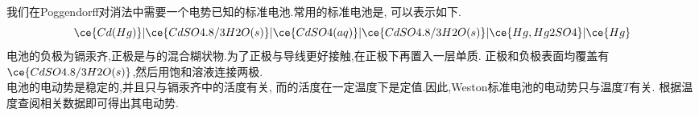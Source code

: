 \documentclass{ctexart}
\begin{document}
\indent 我们在Poggendorff对消法中需要一个电势已知的标准电池.常用的标准电池是,%
可以表示如下.
\[\ce{Cd(Hg)}\vert\ce{CdSO4.8/3H2O(s)}\vert\ce{CdSO4(aq)}\vert\ce{CdSO4.8/3H2O(s)}\vert\ce{Hg,Hg2SO4}\vert\ce{Hg}\]
电池的负极为镉汞齐,正极是与的混合糊状物.为了正极与导线更好接触,在正极下再置入一层单质.%
正极和负极表面均覆盖有$\displaystyle\ce{CdSO4.8/3H2O(s)}$,然后用饱和溶液连接两极.\\
\indent 电池的电动势是稳定的,并且只与镉汞齐中的活度有关,%
而的活度在一定温度下是定值.因此,Weston标准电池的电动势只与温度$T$有关.%
根据温度查阅相关数据即可得出其电动势.
\end{document}
